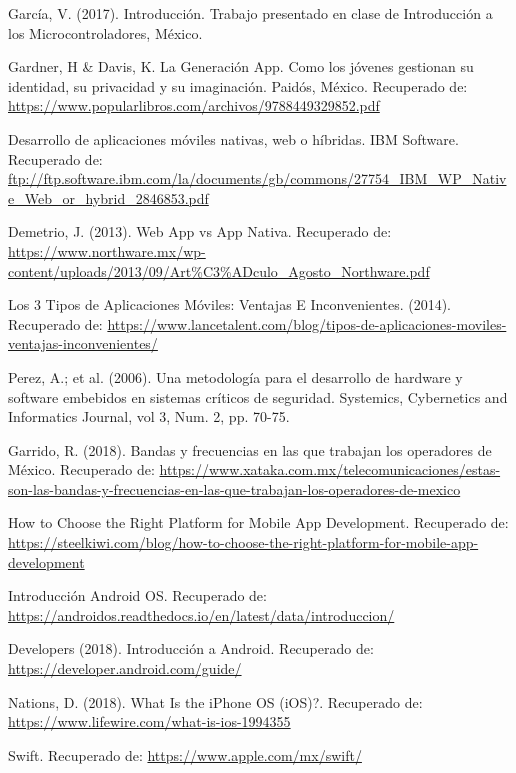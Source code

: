 \begin{thebibliography}{0}
	 García, V. (2017). Introducción. Trabajo presentado en clase de Introducción a los Microcontroladores, México.
	
	 Gardner, H \& Davis, K. La Generación App. Como los jóvenes gestionan su identidad, su privacidad y su imaginación. Paidós, México. Recuperado de: \url{https://www.popularlibros.com/archivos/9788449329852.pdf}
	
	 Desarrollo de aplicaciones móviles nativas, web o híbridas. IBM Software. Recuperado de: \url{ftp://ftp.software.ibm.com/la/documents/gb/commons/27754_IBM_WP_Native_Web_or_hybrid_2846853.pdf}
	
	 Demetrio, J. (2013). Web App vs App Nativa. Recuperado de: \url{https://www.northware.mx/wp-content/uploads/2013/09/Art%C3%ADculo_Agosto_Northware.pdf}
		
	 Los 3 Tipos de Aplicaciones Móviles: Ventajas E Inconvenientes. (2014). Recuperado de: \url{https://www.lancetalent.com/blog/tipos-de-aplicaciones-moviles-ventajas-inconvenientes/}
	
	 Perez, A.; et al. (2006). Una metodología para el desarrollo de hardware y software embebidos en sistemas críticos de seguridad. Systemics, Cybernetics and Informatics Journal, vol 3, Num. 2, pp. 70-75.

	 Garrido, R. (2018). Bandas y frecuencias en las que trabajan los operadores de México. Recuperado de: \url{https://www.xataka.com.mx/telecomunicaciones/estas-son-las-bandas-y-frecuencias-en-las-que-trabajan-los-operadores-de-mexico}
	
	 How to Choose the Right Platform for Mobile App Development. Recuperado de: \url{https://steelkiwi.com/blog/how-to-choose-the-right-platform-for-mobile-app-development}
	
	 Introducción Android OS. Recuperado de: \url{https://androidos.readthedocs.io/en/latest/data/introduccion/}
	
	 Developers (2018). Introducción a Android. Recuperado de: \url{https://developer.android.com/guide/}
	
	 Nations, D. (2018). What Is the iPhone OS (iOS)?. Recuperado de: \url{https://www.lifewire.com/what-is-ios-1994355}
	
	 Swift. Recuperado de: \url{https://www.apple.com/mx/swift/}
	
	
	
\end{thebibliography}